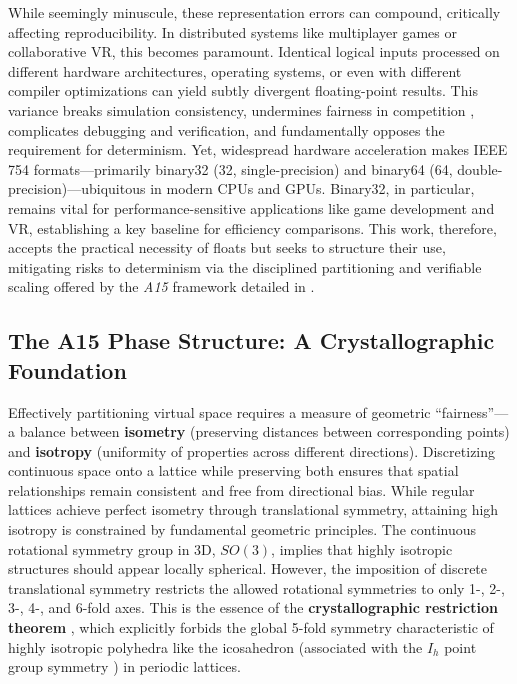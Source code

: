 \documentclass[10pt]{article}
\def\AAAB{\textit{A15}}
\begin{document}
While seemingly minuscule, these representation errors can compound, critically affecting reproducibility. In distributed systems like multiplayer games or collaborative VR, this becomes paramount. Identical logical inputs processed on different hardware architectures, operating systems, or even with different compiler optimizations can yield subtly divergent floating-point results. This variance breaks simulation consistency, undermines fairness in competition \cite{Claypool2006}, complicates debugging and verification, and fundamentally opposes the requirement for determinism. Yet, widespread hardware acceleration makes IEEE 754 formats---primarily binary32 (\SI{32}{\bit}, single-precision) and binary64 (\SI{64}{\bit}, double-precision)---ubiquitous in modern CPUs and GPUs. Binary32, in particular, remains vital for performance-sensitive applications like game development and VR, establishing a key baseline for efficiency comparisons. This work, therefore, accepts the practical necessity of floats but seeks to structure their use, mitigating risks to determinism via the disciplined partitioning and verifiable scaling offered by the \AAAB{} framework detailed in .

\subsection{The A15 Phase Structure: A Crystallographic Foundation}\label{subsec-intro-a15}

Effectively partitioning virtual space requires a measure of geometric ``fairness''—a balance between \textbf{isometry} (preserving distances between corresponding points) and \textbf{isotropy} (uniformity of properties across different directions). Discretizing continuous space onto a lattice while preserving both ensures that spatial relationships remain consistent and free from directional bias. While regular lattices achieve perfect isometry through translational symmetry, attaining high isotropy is constrained by fundamental geometric principles. The continuous rotational symmetry group in 3D, $SO(3)$, implies that highly isotropic structures should appear locally spherical. However, the imposition of discrete translational symmetry restricts the allowed rotational symmetries to only 1-, 2-, 3-, 4-, and 6-fold axes. This is the essence of the \textbf{crystallographic restriction theorem} \cite{AshcroftMermin1976}, which explicitly forbids the global 5-fold symmetry characteristic of highly isotropic polyhedra like the icosahedron (associated with the $I_h$ point group symmetry \cite{Coxeter1973}) in periodic lattices.
\end{document}
